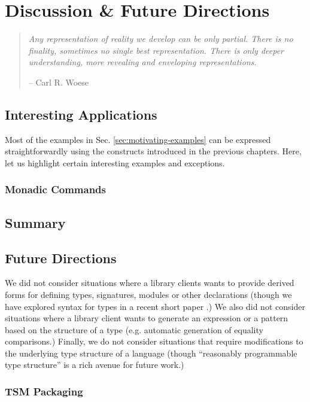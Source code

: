 \chapter{Discussion \& Future Directions}\label{chap:conclusion}
\begin{quote}
\emph{Any representation of reality we develop can be only partial. There is no finality, sometimes no single best representation. There is only deeper understanding, more revealing and enveloping representations.
}

-- Carl R. Woese \cite{woese}
\end{quote}

\section{Interesting Applications}
Most of the examples in Sec. \ref{sec:motivating-examples} can be expressed straightforwardly using the constructs introduced in the previous chapters. Here, let us highlight certain interesting examples and exceptions.

\subsection{Monadic Commands}\label{sec:application-monadic-commands}

\section{Summary}

\section{Future Directions}\label{sec:future-work}
We did not consider situations where a library clients wants to provide derived forms for defining types, signatures, modules or other declarations (though we have explored syntax for types in a recent short paper \cite{sac15}.) We also did not consider situations where a library client wants to generate an expression or a pattern based on the structure of a type (e.g. automatic generation of equality comparisons.) Finally, we do not consider situations that require modifications to the underlying type structure of a language (though ``reasonably programmable type structure'' is a rich avenue for future work.)

\subsection{TSM Packaging}\label{sec:tsm-packaging}

